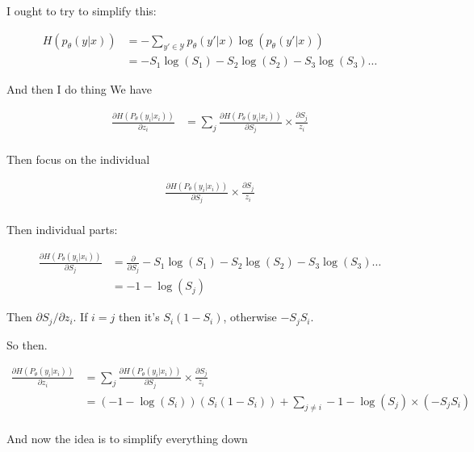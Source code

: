\documentclass{article}
\begin{document}
		I ought to try to simplify this:
		
		\begin{align}
			H(p_\theta(y|x)) &= -\sum_{y'\in\mathcal{Y}} p_\theta(y'|x)\log(p_\theta(y'|x))\\
			&= -S_1\log(S_1) -S_2\log(S_2) -S_3\log(S_3)\ldots 
		\end{align}
		
		And then I do thing We have 
		
		\begin{align}
			\frac{\partial H(P_\theta(y_i|x_i))}{\partial z_i} &= \sum_j \frac{\partial H(P_\theta(y_i|x_i))}{\partial S_j}\times \frac{\partial S_j}{z_i}\\
		\end{align}
		
		Then focus on the individual
		
		\begin{align}
			\frac{\partial H(P_\theta(y_i|x_i))}{\partial S_j}\times \frac{\partial S_j}{z_i}\\
		\end{align}
		
		Then individual parts:
		
		\begin{align}
			\frac{\partial H(P_\theta(y_i|x_i))}{\partial S_j} &= \frac{\partial}{\partial S_j} -S_1\log(S_1) -S_2\log(S_2) -S_3\log(S_3)\ldots\\
			&= -1-\log(S_j)
		\end{align}
		
		Then $\partial S_j/\partial z_i$. If $i=j$ then it's $S_i(1-S_i)$, otherwise $-S_jS_i$.
		
		So then.
		
		\begin{align}
			\frac{\partial H(P_\theta(y_i|x_i))}{\partial z_i} &= \sum_j \frac{\partial H(P_\theta(y_i|x_i))}{\partial S_j}\times \frac{\partial S_j}{z_i}\\
			&= (-1-\log(S_i))(S_i(1-S_i)) + \sum_{j\neq i} -1-\log(S_j)\times (-S_jS_i)\\
		\end{align}
		
		And now the idea is to simplify everything down
		
\end{document}

